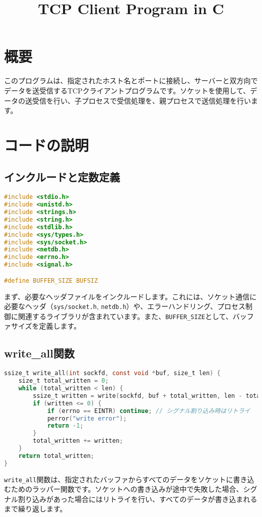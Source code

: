 \documentclass{article}
\begin{document}
\title{TCP Client Program in C}
\author{}
\date{}
\maketitle

\section{概要}
このプログラムは、指定されたホスト名とポートに接続し、サーバーと双方向でデータを送受信するTCPクライアントプログラムです。ソケットを使用して、データの送受信を行い、子プロセスで受信処理を、親プロセスで送信処理を行います。

\section{コードの説明}

\subsection{インクルードと定数定義}
\begin{lstlisting}[language=C]
#include <stdio.h>
#include <unistd.h>
#include <strings.h>
#include <string.h>
#include <stdlib.h>
#include <sys/types.h>
#include <sys/socket.h>
#include <netdb.h>
#include <errno.h>
#include <signal.h>

#define BUFFER_SIZE BUFSIZ
\end{lstlisting}
まず、必要なヘッダファイルをインクルードします。これには、ソケット通信に必要なヘッダ（\texttt{sys/socket.h}, \texttt{netdb.h}）や、エラーハンドリング、プロセス制御に関連するライブラリが含まれています。また、\texttt{BUFFER\_SIZE}として、バッファサイズを定義します。

\subsection{write\_all関数}
\begin{lstlisting}[language=C]
ssize_t write_all(int sockfd, const void *buf, size_t len) {
    size_t total_written = 0;
    while (total_written < len) {
        ssize_t written = write(sockfd, buf + total_written, len - total_written);
        if (written <= 0) {
            if (errno == EINTR) continue; // シグナル割り込み時はリトライ
            perror("write error");
            return -1;
        }
        total_written += written;
    }
    return total_written;
}
\end{lstlisting}
\texttt{write\_all}関数は、指定されたバッファからすべてのデータをソケットに書き込むためのラッパー関数です。ソケットへの書き込みが途中で失敗した場合、シグナル割り込みがあった場合にはリトライを行い、すべてのデータが書き込まれるまで繰り返します。
\end{document}

